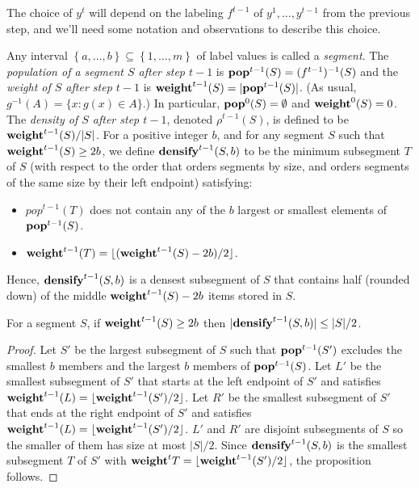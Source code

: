 \documentclass[unicode,review]{siamart1116}
\newcommand{\natInt}[2]{ \left\{ #1, \dotsc, #2 \right\} }
\newcommand{\pop}{{\rm {\bf pop}}}
\newcommand{\weight}{{\rm {\bf weight}}}
\newcommand{\densify}{{\rm {\bf densify}}}
\numberwithin{theorem}{section}
\providecommand{\DIFadd}[1]{{\protect\color{blue}\uwave{#1}}} %
\providecommand{\DIFdel}[1]{{\protect\color{red}\sout{#1}}}                      %
\providecommand{\DIFaddbegin}{} %
\providecommand{\DIFaddend}{} %
\providecommand{\DIFdelbegin}{} %
\providecommand{\DIFdelend}{} %
\newcommand{\DIFscaledelfig}{0.5}
\newlength{\DIFdelgraphicswidth} %
\newlength{\DIFdelgraphicsheight} %
\newcommand{\DIFaddincludegraphics}[2][]{{\color{blue}\fbox{\DIFOincludegraphics[#1]{#2}}}} %
\newcommand{\DIFdelincludegraphics}[2][]{%
\sbox{\DIFdelgraphicsbox}{\DIFOincludegraphics[#1]{#2}}%
\settoboxwidth{\DIFdelgraphicswidth}{\DIFdelgraphicsbox} %
\settoboxtotalheight{\DIFdelgraphicsheight}{\DIFdelgraphicsbox} %
\scalebox{\DIFscaledelfig}{%
\parbox[b]{\DIFdelgraphicswidth}{\usebox{\DIFdelgraphicsbox}\\[-\baselineskip] \rule{\DIFdelgraphicswidth}{0em}}\llap{\resizebox{\DIFdelgraphicswidth}{\DIFdelgraphicsheight}{%
\setlength{\unitlength}{\DIFdelgraphicswidth}%
\begin{picture}(1,1)%
\thicklines\linethickness{2pt} %
{\color[rgb]{1,0,0}\put(0,0){\framebox(1,1){}}}%
{\color[rgb]{1,0,0}\put(0,0){\line( 1,1){1}}}%
{\color[rgb]{1,0,0}\put(0,1){\line(1,-1){1}}}%
\end{picture}%
}\hspace*{3pt}}} %
} %
\DeclareRobustCommand{\DIFaddbegin}{\DIFOaddbegin \let\includegraphics\DIFaddincludegraphics} %
\DeclareRobustCommand{\DIFaddend}{\DIFOaddend \let\includegraphics\DIFOincludegraphics} %
\DeclareRobustCommand{\DIFdelbegin}{\DIFOdelbegin \let\includegraphics\DIFdelincludegraphics} %
\DeclareRobustCommand{\DIFdelend}{\DIFOaddend \let\includegraphics\DIFOincludegraphics} %
\begin{document}
The choice of $y^t$ will depend on
the labeling $f^{t-1}$ of $y^1,\ldots,y^{t-1}$ from the previous step, and we'll need some notation and
observations to describe this choice.   

Any interval $\natInt{a}{b} \subseteq \natInt{1}{m}$ of label values is called a \emph{segment}.
The \emph{population of a segment $S$ after step $t-1$} is $\pop^{t-1}(S) = (f^{t-1})^{-1}(S)$ and the
\emph{weight of $S$ after step $t-1$} is $\weight^{t-1}(S) = |\pop^{t-1}(S)|$. (As usual, $g^{-1}(A) = \{ x : g(x) \in A \}$.)
In particular,  $\pop^0(S) = \emptyset$ and $\weight^0(S) = 0$.
The \emph{density of $S$ after step $t-1$}, denoted $\rho^{t-1}(S)$, is defined to be $\weight^{t-1}(S) / |S|$. For a positive
integer $b$, and for any segment $S$ such that $\weight^{t-1}(S) \geq 2b$, we define
$\densify^{t-1}(S,b)$ to be the minimum  subsegment $T$ of $S$ (with respect to the order that
orders segments by size, and orders segments of the same size by their left endpoint) satisfying:

\begin{itemize}
\item \DIFdelbegin \DIFdel{$pop^{t-1}(T)$ }\DIFdelend \DIFaddbegin \DIFadd{$\pop^{t-1}(T)$ }\DIFaddend does not contain any of the  $b$ largest or smallest elements of $\pop^{t-1}(S)$.
\item  $\weight^{t-1}(T)=\lfloor (\weight^{t-1}(S)-2b)/2 \rfloor$.
\end{itemize} 

Hence, $\densify^{t-1}(S,b)$ is a densest subsegment of $S$ that contains half (rounded down)  of the middle $\weight^{t-1}(S)-2b$ items
stored in $S$.


\iffalse
These $b$ items on either side of $T$ form the left and right buffers described in \cref{s-1.1}.
\fi
\begin{proposition}
\label{prop:shrinks}
For a segment $S$, if $\weight^{t-1}(S) \geq 2b$ then $|\densify^{t-1}(S,b)| \leq |S|/2$.
\end{proposition}

\begin{proof}
Let $S'$ be the largest subsegment of $S$ such that $\pop^{t-1}(S')$ excludes the
smallest $b$  members and the largest $b$ members of $\pop^{t-1}(S)$.  
Let $L'$ be the smallest subsegment of $S'$ that starts at the left endpoint of $S'$
and satisfies  $\weight^{t-1}(L)=\lfloor \weight^{t-1}(S')/2 \rfloor$.  Let $R'$
 be the smallest subsegment of $S'$ that ends at the right endpoint of $S'$
and satisfies  $\weight^{t-1}(L)=\lfloor \weight^{t-1}(S')/2 \rfloor$.
$L'$ and $R'$ are disjoint subsegments of $S$ so the smaller of them has
size at most $|S|/2$. Since $\densify^{t-1}(S,b)$ is the smallest subsegment $T$ of $S'$ with
\DIFdelbegin \DIFdel{$\weight^t{T} = \lfloor \weight^{t-1}(S')/2 \rfloor$}\DIFdelend \DIFaddbegin \DIFadd{$\weight^t(T) = \lfloor \weight^{t-1}(S')/2 \rfloor$}\DIFaddend , the proposition follows.
\end{proof} 
\end{document}
